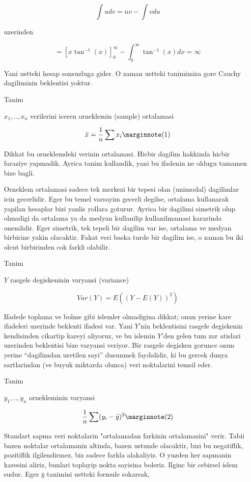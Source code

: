 \documentclass[12pt,fleqn]{article}\usepackage{../common}
\begin{document}
$$ \int udv = uv - \int vdu $$
 
uzerinden

$$ = [x \tan ^{-1}(x) ] _{ 0}^{\infty} - \int _{ 0}^{\infty} \tan ^{-1}(x)
dx  = \infty$$

Yani ustteki hesap sonsuzluga gider. O zaman ustteki tanimimiza gore Cauchy
dagiliminin beklentisi yoktur. 

Tanim

$x_1,..,x_n$ verilerini iceren orneklemin (sample) ortalamasi 

$$ \bar{x} = \frac{1}{n} \sum x_i
\mlabel{1}
$$

Dikkat bu orneklemdeki verinin ortalamasi. Hicbir dagilim hakkinda hicbir
faraziye yapmadik. Ayrica tanim kullandik, yani bu ifadenin ne oldugu
tamamen bize bagli. 

Orneklem ortalamasi sadece tek merkezi bir tepesi olan (unimodal)
dagilimlar icin gecerlidir. Eger bu temel varsayim gecerli degilse,
ortalama kullanarak yapilan hesaplar bizi yanlis yollara goturur. Ayrica
bir dagilimi simetrik olup olmadigi da ortalama ya da medyan kullanilip
kullanilmamasi kararinda onemlidir. Eger simetrik, tek tepeli bir dagilim
var ise, ortalama ve medyan birbirine yakin olacaktir. Fakat veri baska
turde bir dagilim ise, o zaman bu iki olcut birbirinden cok farkli
olabilir.


Tanim

$Y$ rasgele degiskeninin varyansi (variance) 

$$ Var(Y) = E((Y-E(Y))^2) $$

Ifadede toplama ve bolme gibi islemler olmadigina dikkat; onun yerine kare
ifadeleri uzerinde beklenti ifadesi var. Yani $Y$'nin beklentisini rasgele
degiskenin kendisinden cikartip kareyi aliyoruz, ve bu islemin $Y$'den
gelen tum zar atislari uzerinden beklentisi bize varyansi veriyor. Bir
rasgele degisken gorunce onun yerine ``dagilimdan uretilen sayi'' dusunmek
faydalidir, ki bu gercek dunya sartlarindan (ve buyuk miktarda olunca) veri
noktalarini temsil eder. 

Tanim

$y_1,..,y_n$ ornekleminin varyansi 

$$ \frac{1}{n} \sum (y_i - \bar{y})^2
\mlabel{2}
$$

Standart sapma veri noktalarin "ortalamadan farkinin ortalamasini"
verir. Tabii bazen noktalar ortalamanin altinda, bazen ustunde olacaktir,
bizi bu negatiflik, pozitiflik ilgilendirmez, biz sadece farkla
alakaliyiz. O yuzden her sapmanin karesini aliriz, bunlari toplayip nokta
sayisina boleriz. Ilginc bir cebirsel islem sudur. Eger $\bar{y}$ tanimini
ustteki formule sokarsak,
\end{document}
